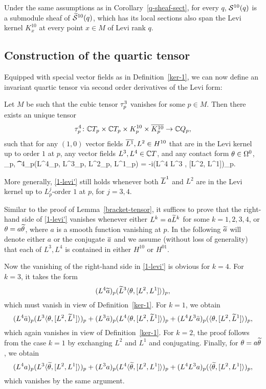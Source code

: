 \documentclass[12pt]{amsart}
\begin{document}
\bc{}
Under the same assumptions as in Corollary~\ref{q-sheaf-sect},
for every $q$,
${\mathcal{S}}^{10}(q)$ is a submodule sheaf of $\widetilde{{\mathcal{S}}}^{10}(q)$,
which has its local sections also
span the Levi kernel $K^{10}_x$
at every point $x\in M$ of Levi rank $q$.
\ec




\subsection{Construction of the quartic tensor}
Equipped with special vector fields as in Definition~\ref{ker-1},
we can now define an invariant quartic tensor
via second order derivatives of the Levi form:

\bl{}
Let $M$ be such that the cubic tensor $\tau^3_p$ vanishes for some $p\in M$.
Then there exists an unique tensor
$$
	\tau^4_p \colon  {\mathbb{C}} T_p \times {\mathbb{C}} T_p 
	\times K^{10}_p\times \overline{K^{10}_p} \to {\mathbb{C}} Q_p,
$$
such that for any $(1,0)$ vector fields
$\overline{L^1}, L^2\in H^{10}$ that are in the Levi kernel
up to order $1$ at $p$,
any vector fields $L^3, L^4\in {\mathbb{C}} T$,
and any contact form $\theta\in \Omega^0$,
\beq{}
	\la \th_p, \t^4_p(L^4_p, L^3_p, L^2_p, L^1_p)\ra 
	= -i(L^4 L^3 \la \th, [L^2, L^1]\ra)_p.
\eeq

More generally, \eqref{1-levi'} still holds
whenever both $\overline{L}^1$ and $L^2$
are in the Levi kernel
up to $L^j_p$-order $1$ at $p$, for $j=3,4$.
\el

\bpf
Similar to the proof of Lemma~\ref{bracket-tensor},
it suffices to prove that the right-hand side of \eqref{1-levi'}
vanishes whenever
either $L^k=a\widetilde{L}^k$ for some $k=1,2,3,4$, 
or $\theta = a\widetilde{\theta}$, where $a$ is a smooth function vanishing at $p$.
In the following $\widetilde{a}$ will denote either $a$ or the conjugate $\overline{a}$
and we assume (without loss of generality)
that each of $L^3, L^4$
is contained in either $H^{10}$ or $H^{01}$.

Now the vanishing of the right-hand side in \eqref{1-levi'} 
is obvious for $k=4$.
For $k=3$, it takes
the form
$$
	(L^4\widetilde{a})_p (\widetilde{L}^3 \langle \theta, [L^2, L^1] \rangle)_p,	
$$
which must vanish in view of Definition~\ref{ker-1}.
For $k=1$, we obtain
$$
	(L^4 \bar a)_p (L^3 \langle \theta, [L^2, \widetilde{L}^1] \rangle)_p
	+ 	(L^3 \bar a)_p (L^4 \langle \theta, [L^2, \widetilde{L}^1] \rangle)_p
	+ 	(L^4 L^3 \bar a)_p (\langle \theta, [L^2, \widetilde{L}^1] \rangle)_p
	,
$$
which again vanishes in view of Definition~\ref{ker-1}.
For $k=2$, the proof follows from the case $k=1$
by exchanging $L^2$ and $L^1$ and conjugating.
Finally, for $\theta = a \widetilde{\theta}$, we obtain
$$
	(L^4 a)_p (L^3 \langle \widetilde{\theta}, [L^2, L^1] \rangle)_p
	+ 	(L^3 a)_p (L^4 \langle \widetilde{\theta}, [L^2, L^1] \rangle)_p
	+ 	(L^4 L^3 a)_p (\langle \widetilde{\theta}, [L^2, L^1] \rangle)_p,
$$
which vanishes by the same argument.
\epf
\end{document}
